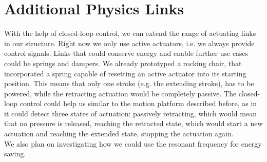 \section{Additional Physics Links}
With the help of closed-loop control, we can extend the range of actuating links in our structure. Right now we only use active actuators, i.e. we always provide control signals. Links that could conserve energy and enable further use cases could be springs and dampers. We already prototyped a rocking chair, that incorporated a spring capable of resetting an active actuator into its starting position. This means that only one stroke (e.g. the extending stroke), has to be powered, while the retracting actuation would be completely passive. The closed-loop control could help us similar to the motion platform described before, as in it could detect three states of actuation: passively retracting, which would mean that no pressure is released, reaching the retracted state, which would start a new actuation and reaching the extended state, stopping the actuation again.\\
We also plan on investigating how we could use the resonant frequency for energy saving.
